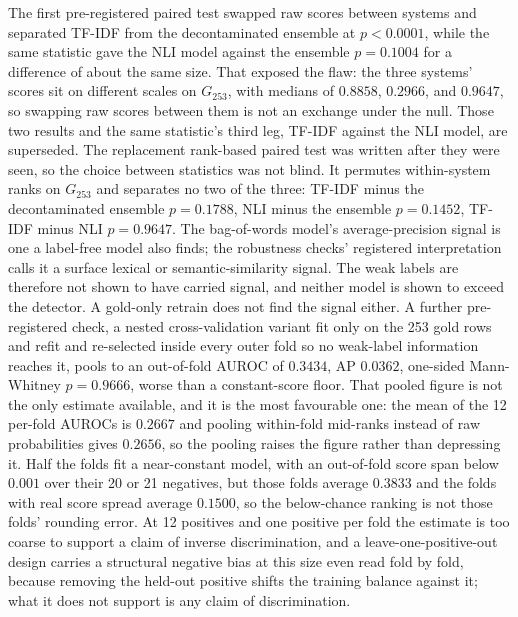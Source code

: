 The first pre-registered paired test swapped raw scores between systems and separated TF-IDF from
the decontaminated ensemble at $p < 0.0001$, while the same statistic gave the NLI model against the ensemble
$p = 0.1004$ for a difference of about the same size. That exposed the flaw: the
three systems' scores sit on different scales on $G_{253}$, with medians of $0.8858$, $0.2966$, and
$0.9647$, so swapping raw scores between them is not an exchange under the null. Those two results
and the same statistic's third leg, TF-IDF against the NLI model, are superseded. The replacement
rank-based paired test was written after they were seen, so the choice between statistics was not
blind. It permutes within-system ranks on $G_{253}$ and separates no two of the three: TF-IDF minus
the decontaminated ensemble $p = 0.1788$, NLI minus the ensemble $p = 0.1452$, TF-IDF minus NLI
$p = 0.9647$. The bag-of-words model's average-precision signal is one a label-free model also finds; the robustness checks' registered interpretation calls it a surface lexical or
semantic-similarity signal. The weak labels are therefore not shown to have carried signal, and neither model is shown to exceed the detector. A gold-only retrain does not find the signal either. A further pre-registered check, a nested cross-validation variant fit only on
the 253 gold rows and refit and re-selected inside every outer fold so no
weak-label information reaches it, pools to an out-of-fold AUROC of
$0.3434$, AP $0.0362$, one-sided Mann-Whitney $p = 0.9666$, worse than a
constant-score floor. That pooled figure is not the only estimate available, and it is the most
favourable one: the mean of the 12 per-fold AUROCs is $0.2667$ and pooling within-fold mid-ranks
instead of raw probabilities gives $0.2656$, so the pooling raises the figure rather than
depressing it. Half the folds fit a near-constant model, with an out-of-fold score span below
$0.001$ over their 20 or 21 negatives, but those folds average $0.3833$ and the folds with real
score spread average $0.1500$, so the below-chance ranking is not those folds' rounding error. At
12 positives and one positive per fold the estimate is too coarse to support a claim of inverse
discrimination, and a leave-one-positive-out design carries a structural negative bias at this size
even read fold by fold, because removing the held-out positive shifts the training balance against
it; what it does not support is any claim of discrimination.


